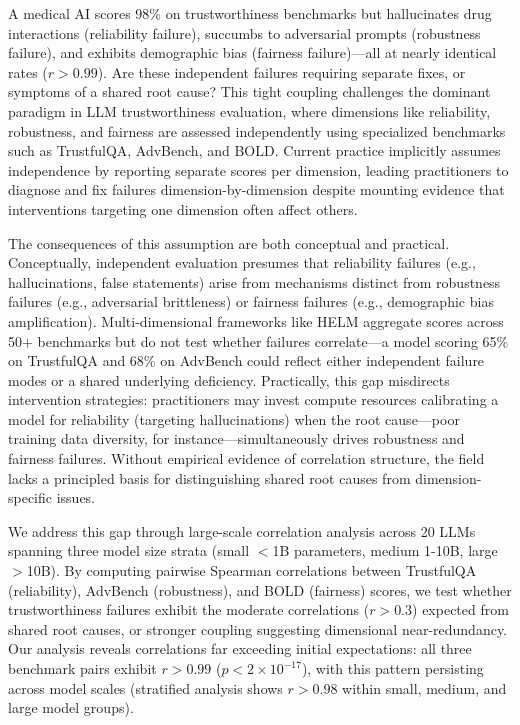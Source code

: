 A medical AI scores 98\% on trustworthiness benchmarks but hallucinates drug interactions (reliability failure), succumbs to adversarial prompts (robustness failure), and exhibits demographic bias (fairness failure)---all at nearly identical rates ($r > 0.99$). Are these independent failures requiring separate fixes, or symptoms of a shared root cause? This tight coupling challenges the dominant paradigm in LLM trustworthiness evaluation, where dimensions like reliability, robustness, and fairness are assessed independently using specialized benchmarks such as TrustfulQA, AdvBench, and BOLD. Current practice implicitly assumes independence by reporting separate scores per dimension, leading practitioners to diagnose and fix failures dimension-by-dimension despite mounting evidence that interventions targeting one dimension often affect others.

The consequences of this assumption are both conceptual and practical. Conceptually, independent evaluation presumes that reliability failures (e.g., hallucinations, false statements) arise from mechanisms distinct from robustness failures (e.g., adversarial brittleness) or fairness failures (e.g., demographic bias amplification). Multi-dimensional frameworks like HELM aggregate scores across 50+ benchmarks but do not test whether failures correlate---a model scoring 65\% on TrustfulQA and 68\% on AdvBench could reflect either independent failure modes or a shared underlying deficiency. Practically, this gap misdirects intervention strategies: practitioners may invest compute resources calibrating a model for reliability (targeting hallucinations) when the root cause---poor training data diversity, for instance---simultaneously drives robustness and fairness failures. Without empirical evidence of correlation structure, the field lacks a principled basis for distinguishing shared root causes from dimension-specific issues.

We address this gap through large-scale correlation analysis across 20 LLMs spanning three model size strata (small $<$1B parameters, medium 1-10B, large $>$10B). By computing pairwise Spearman correlations between TrustfulQA (reliability), AdvBench (robustness), and BOLD (fairness) scores, we test whether trustworthiness failures exhibit the moderate correlations ($r > 0.3$) expected from shared root causes, or stronger coupling suggesting dimensional near-redundancy. Our analysis reveals correlations far exceeding initial expectations: all three benchmark pairs exhibit $r > 0.99$ ($p < 2\times10^{-17}$), with this pattern persisting across model scales (stratified analysis shows $r > 0.98$ within small, medium, and large model groups).

